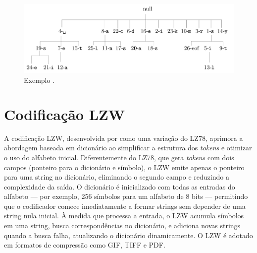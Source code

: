\begin{figure}
\centering
\includegraphics[width=\textwidth]{figures/lz78_tree_example.png}
\caption{Exemplo \parencite{salomon2007}.}
\label{fig:lz78_tree_example}
\end{figure}







\section{Codificação LZW}

A codificação LZW, desenvolvida por \cite{welch1984} como uma variação do
LZ78, aprimora a abordagem baseada em dicionário ao simplificar a estrutura dos
\textit{tokens} e otimizar o uso do alfabeto inicial. Diferentemente do LZ78,
que gera \textit{tokens} com dois campos (ponteiro para o dicionário e
símbolo), o LZW emite apenas o ponteiro para uma string no dicionário,
eliminando o segundo campo e reduzindo a complexidade da saída. O dicionário é
inicializado com todas as entradas do alfabeto --- por exemplo, 256 símbolos
para um alfabeto de 8 bits --- permitindo que o codificador comece
imediatamente a formar strings sem depender de uma string nula inicial. À
medida que processa a entrada, o LZW acumula símbolos em uma string, busca
correspondências no dicionário, e adiciona novas strings quando a busca falha,
atualizando o dicionário dinamicamente. O LZW é adotado em formatos de compressão 
como GIF, TIFF e PDF.

